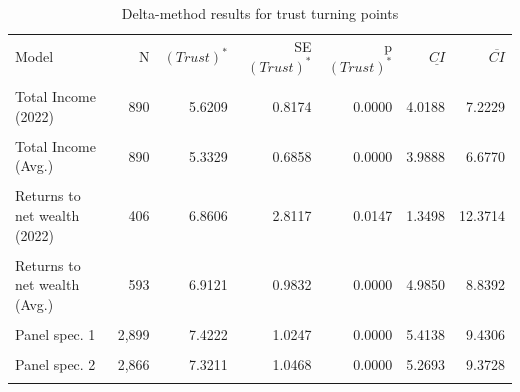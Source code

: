 \begin{table}[htbp]\centering\small
\caption{Delta-method results for trust turning points}
\label{tab:trust_turning_points_original_results_delta}
\begin{tabular}{lrrrrrr}\toprule
Model & N & \((\textit{Trust})^*\) & SE\((\textit{Trust})^*\) & p\((\textit{Trust})^*\) & \(\underline{CI}\) & \(\overline{CI}\) \\\\ \midrule
Total Income (2022) & 890 & 5.6209 & 0.8174 & 0.0000 & 4.0188 & 7.2229 \\\\
Total Income (Avg.) & 890 & 5.3329 & 0.6858 & 0.0000 & 3.9888 & 6.6770 \\\\
Returns to net wealth (2022) & 406 & 6.8606 & 2.8117 & 0.0147 & 1.3498 & 12.3714 \\\\
Returns to net wealth (Avg.) & 593 & 6.9121 & 0.9832 & 0.0000 & 4.9850 & 8.8392 \\\\
Panel spec. 1 & 2,899 & 7.4222 & 1.0247 & 0.0000 & 5.4138 & 9.4306 \\\\
Panel spec. 2 & 2,866 & 7.3211 & 1.0468 & 0.0000 & 5.2693 & 9.3728 \\\\
\bottomrule
\end{tabular}
\end{table}
